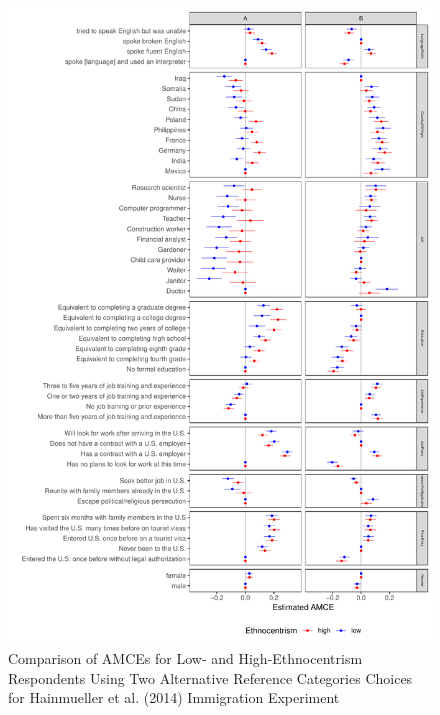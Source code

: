 \documentclass[a4paper,12pt]{article}\usepackage[]{graphicx}\usepackage[]{color}
\makeatletter
\def\maxwidth{ %
  \ifdim\Gin@nat@width>\linewidth
    \linewidth
  \else
    \Gin@nat@width
  \fi
}
\newenvironment{knitrout}{}{} %
\makeatother
\begin{document}
\begin{knitrout}
\color{fgcolor}\begin{figure}
\includegraphics[width=\maxwidth]{figure/hainmueller_subgroup_example_plot-1} \caption[Comparison of AMCEs for Low- and High-Ethnocentrism Respondents Using Two Alternative Reference Categories Choices for Hainmueller et al]{Comparison of AMCEs for Low- and High-Ethnocentrism Respondents Using Two Alternative Reference Categories Choices for Hainmueller et al. (2014) Immigration Experiment}\label{fig:hainmueller_subgroup_example_plot}
\end{figure}


\end{knitrout}
\end{document}
